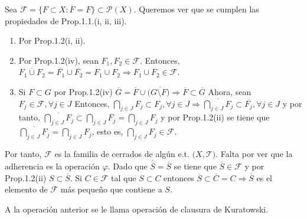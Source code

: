 \begin{dem}
  Sea $ \mathcal{F} = \{ F \subset X : \overline{F} = F \} \subset \mathcal{P}(X)$. Queremos ver que se cumplen las propiedades de Prop.1.1.(i, ii, iii). 
  \begin{enumerate}[label=(\roman*)]
    \item Por Prop.1.2(i, ii).
    \item Por Prop.1.2(iv), sean $F_{1}, F_{2} \in \mathcal{F}$. Entonces, $\overline{F_{1} \cup F_{2}} = \overline{F_{1}} \cup \overline{F_{2}} = F_{1} \cup F_{2} \Rightarrow F_{1} \cup F_{2} \in \mathcal{F}$.
    \item Si $F \subset G$ por Prop.1.2(iv) $\overline{G} = \overline{F} \cup (\overline{G \setminus F)} \Rightarrow \overline{F} \subset \overline{G}$ Ahora, sean $F_{j} \in \mathcal{F}, \forall j \in J$ Entonces, $\bigcap_{j \in J} F_{j} \subset F_{j}, \forall j \in J \Rightarrow \overline{\bigcap_{j \in J}^{} F_{j}} \subset \overline{F_{j}}, \forall j \in J$ y por tanto, $\overline{\bigcap_{j \in J}^{} F_{j}} \subset \bigcap_{j \in J}^{} \overline{F_{j}} = \bigcap_{j \in J}^{} F_{j}$ y por Prop.1.2(ii) se tiene que $ \overline{\bigcap_{j \in J}^{} F_{j}} = \bigcap_{j \in J}^{} F_{j}$, esto es, $ \bigcap_{j \in J}^{} F_{j} \in \mathcal{F}$.
  \end{enumerate}
Por tanto, $\mathcal{F}$ es la familia de cerrados de algún e.t. $\big( X, \mathcal{T} \big)$. Falta por ver que la adherencia es la operación $ \varphi$. Dado que $ \overline{\overline{S}} = \overline{S}$ se tiene que $\overline{S} \in \mathcal{F}$ y por Prop.1.2(ii) $S \subset \overline{S}$. Si $C \in \mathcal{F}$ tal que $S \subset C$ entonces $\overline{S} \subset \overline{C} = C \Rightarrow \overline{S}$ es el elemento de $\mathcal{F}$ más pequeño que contiene a $S$.
\end{dem}

\begin{obs}
  A la operación anterior se le llama operación de clausura de Kuratowski.
\end{obs}
